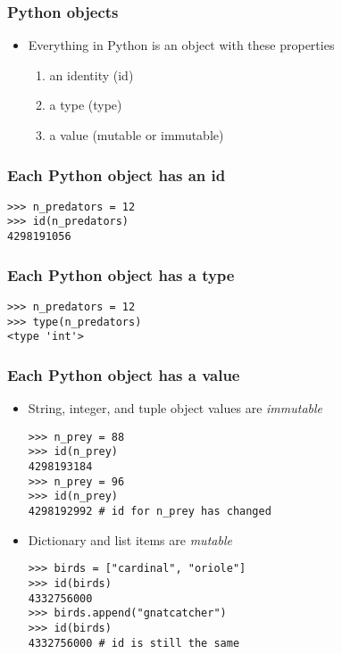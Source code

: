 \documentclass{beamer}
\newcommand\Fontvi{\fontsize{6}{7.2}\selectfont}
\begin{document}



\begin{frame}[fragile]
\frametitle{Python objects}
\begin{itemize}
\item Everything in Python is an object with these properties
\begin{enumerate}  
  \item an identity (id) 
  \item a type (type)
  \item a value (mutable or immutable)
\end{enumerate}
\end{itemize} 
\end{frame}

\begin{frame}[fragile]
\frametitle{Each Python object has an id}
\begin{lstlisting}
>>> n_predators = 12
>>> id(n_predators)
4298191056
\end{lstlisting} 
\end{frame}

\begin{frame}[fragile]
\frametitle{Each Python object has a type}
\begin{lstlisting}
>>> n_predators = 12
>>> type(n_predators)
<type 'int'>
\end{lstlisting}
\end{frame}

\begin{frame}[fragile]
\frametitle{Each Python object has a value}
\begin{itemize}
\item String, integer, and tuple object values are \emph{immutable}
\begin{lstlisting}
>>> n_prey = 88
>>> id(n_prey)
4298193184
>>> n_prey = 96
>>> id(n_prey)
4298192992 # id for n_prey has changed
\end{lstlisting}
\item Dictionary and list items are \emph{mutable}
\begin{lstlisting}
>>> birds = ["cardinal", "oriole"]
>>> id(birds)
4332756000
>>> birds.append("gnatcatcher")
>>> id(birds)
4332756000 # id is still the same
\end{lstlisting}
\end{itemize}
\end{frame}
\end{document}
